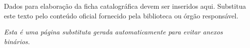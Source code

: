 \begin{titlepage}
    \thispagestyle{empty}
    \vspace*{6cm}
    \begin{center}
        \begin{minipage}{0.8\textwidth}
            \small
            Dados para elaboração da ficha catalográfica devem ser inseridos aqui.\newline
            Substitua este texto pelo conteúdo oficial fornecido pela biblioteca ou órgão responsável.
        \end{minipage}
    \end{center}
    \vfill
    \begin{center}
        \textit{Esta é uma página substituta gerada automaticamente para evitar anexos binários.}
    \end{center}
\end{titlepage}
\clearpage
